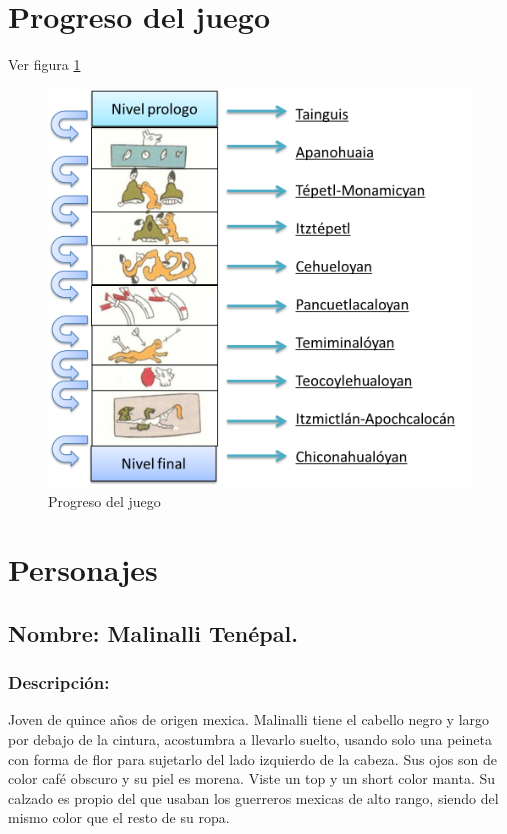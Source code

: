 \documentclass[11pt,letterpaper]{article}
\begin{document}
\section{Progreso del juego}
Ver figura \ref{fig:ProgJuego}
\begin{figure}
  \centering
     \includegraphics[width=\linewidth]{Imagenes/lineaJuego}
  \caption{Progreso del juego}
  \label{fig:ProgJuego}
\end{figure} 

\section{Personajes}

\subsection{Nombre: Malinalli Tenépal.} \label{per.malinalli}
	\subsubsection{Descripción:}
Joven de quince años de origen mexica. Malinalli tiene el cabello negro y largo por debajo de la cintura, acostumbra a llevarlo suelto, usando solo una peineta con forma de flor para sujetarlo del lado izquierdo de la cabeza. Sus ojos son de color café obscuro y su piel es morena. Viste un top y un short color manta. Su calzado es propio del que usaban los guerreros mexicas de alto rango, siendo del mismo color que el resto de su ropa.   
\end{document}
